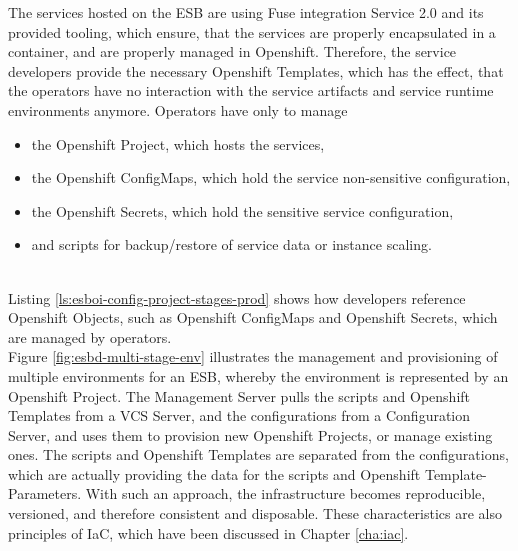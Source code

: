 The services hosted on the ESB are using Fuse integration Service 2.0 and its provided tooling, which ensure, that the services are properly encapsulated in a container, and are properly managed in Openshift. Therefore, the service developers provide the necessary Openshift Templates, which has the effect, that the operators have no interaction with the service artifacts and service runtime environments anymore. Operators have only to manage
\begin{itemize}
	\item the Openshift Project, which hosts the services,
	\item the Openshift ConfigMaps, which hold the service non-sensitive configuration,
	\item the Openshift Secrets, which hold the sensitive service configuration,
	\item and scripts for backup/restore of service data or instance scaling.
\end{itemize} 
\ \\
Listing \vref{ls:esboi-config-project-stages-prod} shows how developers reference Openshift Objects, such as Openshift ConfigMaps and Openshift Secrets, which are managed by operators. \\ 

Figure \vref{fig:esbd-multi-stage-env} illustrates the management and provisioning of multiple environments for an ESB, whereby the environment is represented by an Openshift Project. The Management Server pulls the scripts and Openshift Templates from a VCS Server, and the configurations from a Configuration Server, and uses them to provision new Openshift Projects, or manage existing ones. The scripts and Openshift Templates are separated from the configurations, which are actually providing the data for the scripts and Openshift Template-Parameters. With such an approach, the infrastructure becomes reproducible, versioned, and therefore consistent and disposable. These characteristics are also principles of IaC, which have been discussed in Chapter \vref{cha:iac}. 

